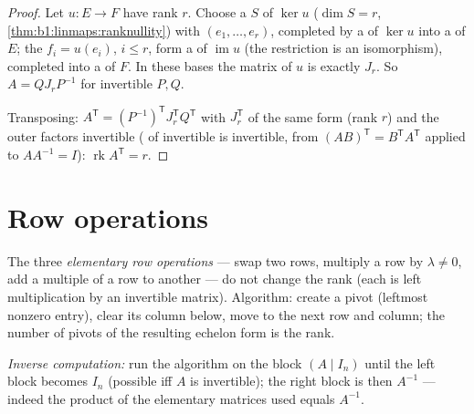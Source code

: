 \begin{proof}
Let $u \colon E \to F$ have rank $r$. Choose a  $S$ of
$\ker u$ ($\dim S = r$, \cref{thm:b1:linmaps:ranknullity}) with
 $(e_1, \dots, e_r)$, completed by a  of $\ker u$ into a
 of $E$; the  $f_i = u(e_i)$, $i \leq r$, form a  of
$\operatorname{im} u$ (the restriction is an isomorphism), completed
into a  of $F$. In these bases the matrix of $u$ is exactly
$J_r$. So $A = Q J_r P^{-1}$ for invertible $P, Q$.

Transposing: $A^{\mathsf T} = (P^{-1})^{\mathsf T} J_r^{\mathsf T} Q^{\mathsf T}$
with $J_r^{\mathsf T}$ of the same form (rank $r$) and the outer
factors invertible ( of invertible is invertible, from
$(AB)^{\mathsf T} = B^{\mathsf T}A^{\mathsf T}$ applied to $AA^{-1} = I$):
$\operatorname{rk} A^{\mathsf T} = r$.
\end{proof}

\section{Row operations}

\begin{method}\label{met:b1:matrices:gauss}
The three \emph{elementary row operations} ---
swap two rows, multiply a row by $\lambda \neq 0$, add a multiple of
a row to another --- do not change the rank (each is left
multiplication by an invertible matrix). Algorithm: create a pivot
(leftmost nonzero entry), clear its column below, move to the next
row and column; the number of pivots of the resulting echelon form
is the rank.

\emph{Inverse computation:} run the algorithm on the block $(A \mid
I_n)$ until the left block becomes $I_n$ (possible iff $A$ is
invertible); the right block is then $A^{-1}$ --- indeed the product
of the elementary matrices used equals $A^{-1}$.
\end{method}

